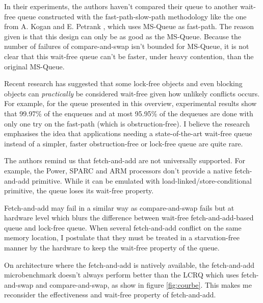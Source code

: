 In their experiments, the authors haven't compared their queue to another
wait-free queue constructed with the fast-path-slow-path methodology like the
one from A. Kogan and E. Petrank \cite{Kogan:2012:MCF:2370036.2145835}, which
uses MS-Queue as fast-path. The reason given is that this design can only be as
good as the MS-Queue. Because the number of failures of compare-and-swap isn't
bounded for MS-Queue, it is not clear that this wait-free queue can't be faster,
under heavy contention, than the original MS-Queue.

Recent research has suggested that some lock-free objects
\cite{Alistarh:2016:LCA:2997039.2903136} and even blocking objects
\cite{David:2016:CSD:2935764.2935774} can \textit{practically} be considered
wait-free given how unlikely conflicts occurs. For example, for the queue
presented in this overview, experimental results show that 99.97\% of the
enqueues and at most 95.95\% of the dequeues are done with only one try on the
fast-path (which is obstruction-free). I believe the research emphasises the
idea that applications needing a state-of-the-art wait-free queue instead of a
simpler, faster obstruction-free or lock-free queue are quite rare.

The authors remind us that fetch-and-add are not universally supported. For
example, the Power, SPARC and ARM processors don't provide a native
fetch-and-add primitive. While it can be emulated with
load-linked/store-conditional primitive, the queue loses its wait-free property.

Fetch-and-add may fail in a similar way as compare-and-swap fails but at
hardware level which blurs the difference between wait-free fetch-and-add-based
queue and lock-free queue. When several fetch-and-add conflict on the same
memory location, I postulate that they must be treated in a starvation-free
manner by the hardware to keep the wait-free property of the queue.

On architecture where the fetch-and-add is natively available, the fetch-and-add
microbenchmark doesn't always perform better than the LCRQ which uses
fetch-and-swap and compare-and-swap, as show in figure \ref{fig:courbe}. This
makes me reconsider the effectiveness and wait-free property of fetch-and-add.
